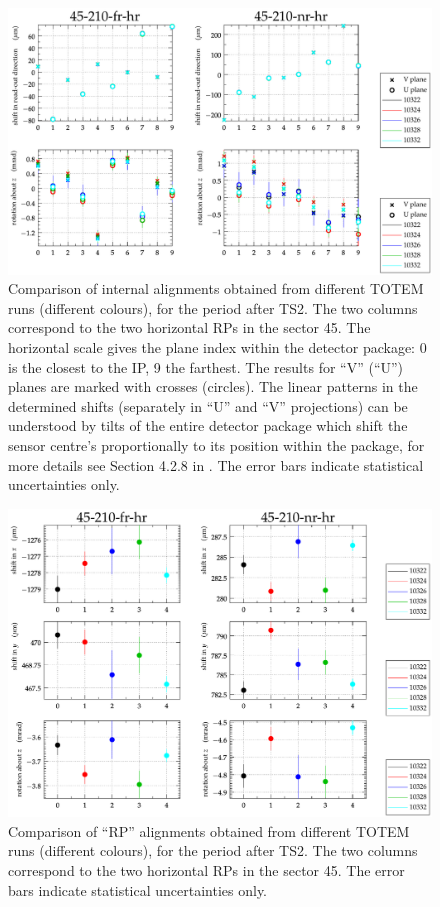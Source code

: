 \documentclass[TOTEM]{cern/cernphprep}
\begin{document}
\begin{figure}[h!]
\begin{center}
\includegraphics[width=0.8\hsize]{fig/calibration_fill/plots_per_plane_left.pdf}
\caption{%
Comparison of internal alignments obtained from different TOTEM runs (different colours), for the period after TS2. The two columns correspond to the two horizontal RPs in the sector 45. The horizontal scale gives the plane index within the detector package: 0 is the closest to the IP, 9 the farthest. The results for ``V'' (``U'') planes are marked with crosses (circles). The linear patterns in the determined shifts (separately in ``U'' and ``V'' projections) can be understood by tilts of the entire detector package which shift the sensor centre's proportionally to its position within the package, for more details see Section 4.2.8 in \cite{jan_thesis}. The error bars indicate statistical uncertainties only.
}
\label{fig:tb_example_internal}
\end{center}
\end{figure}

\begin{figure}[h!]
\begin{center}
\includegraphics[width=0.8\hsize]{fig/calibration_fill/plots_per_rp_left.pdf}
\caption{%
Comparison of ``RP'' alignments obtained from different TOTEM runs (different colours), for the period after TS2. The two columns correspond to the two horizontal RPs in the sector 45. The error bars indicate statistical uncertainties only.
}
\label{fig:tb_example_rp}
\end{center}
\end{figure}
\end{document}
